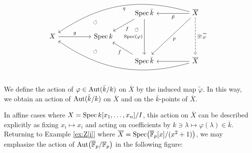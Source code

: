\[
\begin{tikzcd}
    &&& \Spec\bar{k} && \overline{X} \\
    X && \Spec k &&& \\
    &&& \Spec\bar{k} && \overline{X}
    \arrow[from=1-6,to=1-4, "{\tilde{p}}"]
    \arrow[from=1-4,to=2-3, "{f}"]
    \arrow[from=1-6,to=2-1,bend right=25, "{q}"]
    \arrow[from=2-1,to=2-3, "{g}"]
    \arrow[from=3-6,to=3-4]
    \arrow[from=3-4,to=2-3, "{f}"]
    \arrow[from=3-6,to=2-1,bend left=25]
    \arrow[from=1-4,to=3-4,
        "{\Spec(\varphi)}"']
    \arrow[from=1-6,to=3-6,
        dashed,
        "{\exists!\,\widetilde{\varphi}}"]
    \arrow[from=1-6,to=3-4, "{p}"]
    \arrow[
        phantom,
        from=2-1,to=1-4,
        yshift=0.5em,
        "{\scriptstyle\circlearrowleft}" description
    ]
    \arrow[
        phantom,
        from=1-4,to=3-4,
        xshift=-1.15em,
        yshift=1.0em,
        "{\scriptstyle\circlearrowleft}" description
    ]
    \arrow[
        phantom,
        from=2-1,to=3-4,
        yshift=-0.5em,
        "{\scriptstyle\circlearrowleft}" description
    ]
\end{tikzcd}
\]

We define the action of $\varphi\in\operatorname{Aut}(\bar k/k)$ on $\overline X$ by the induced map $\widetilde{\varphi}$. In this way, we obtain an action of $\operatorname{Aut}(\bar k/k)$ on $\overline X$ and on the $\bar k$-points of $\overline X$.

In affine cases where $X = \operatorname{Spec} k[x_1, \dots, x_n]/I$, this action on $\overline{X}$ can be described explicitly as fixing $x_i \mapsto x_i$ and acting on coefficients by $k \ni \lambda \mapsto \varphi(\lambda) \in \overline{k}$. Returning to Example \ref{ex:Z[i]} where $\overline{X} = \operatorname{Spec}\bigl(\overline{\mathbb{F}}_p[x]/(x^2 + 1)\bigr)$, we may emphasize the action of $\operatorname{Aut}\bigl(\overline{\mathbb{F}}_p/\mathbb{F}_p\bigr)$ in the following figure:

